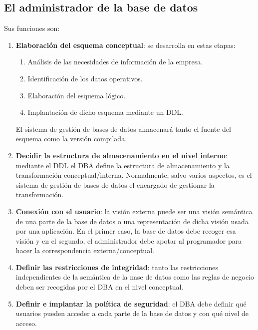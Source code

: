 \documentclass[10pt,a4paper,spanish]{report}
\begin{document}
\textcolor[rgb]{1,0.2,0.3}{\section{El administrador de la base de datos}}
Sus funciones son:
\begin{enumerate}[$\heartsuit$]
    \item \textcolor[rgb]{1,0.2,0.3}{\textbf{Elaboración del esquema conceptual}}: se desarrolla en estas etapas:
    \begin{enumerate}[1.-]
        \item Análisis de las necesidades de información de la empresa.
        \item Identificación de los datos operativos.
        \item Elaboración del esquema lógico.
        \item Implantación de dicho esquema mediante un DDL.
    \end{enumerate}
    El sistema de gestión de bases de datos almacenará tanto el fuente del esquema como la versión compilada.

    \item \textcolor[rgb]{1,0.2,0.3}{\textbf{Decidir la estructura de almacenamiento en el nivel interno}}: mediante el DDL el DBA define la estructura de almacenamiento y la transformación conceptual/interna. Normalmente, salvo varios aspectos, es el sistema de gestión de bases de datos el encargado de gestionar la transformación.

    \item \textcolor[rgb]{1,0.2,0.3}{\textbf{Conexión con el usuario}}: la visión externa puede ser una visión semántica de una parte de la base de datos o una representación de dicha visión usada por una aplicación. En el primer caso, la base de datos debe recoger esa visión y en el segundo, el administrador debe apotar al programador para hacer la correspondencia externa/conceptual.

    \item \textcolor[rgb]{1,0.2,0.3}{\textbf{Definir las restricciones de integridad}}: tanto las restricciones independientes de la semántica de la nase de datos como las reglas de negocio deben ser recogidas por el DBA en el nivel conceptual.

    \item \textcolor[rgb]{1,0.2,0.3}{\textbf{Definir e implantar la política de seguridad}}: el DBA debe definir qué usuarios pueden acceder a cada parte de la base de datos y con qué nivel de acceso.


\end{enumerate}
\end{document}
